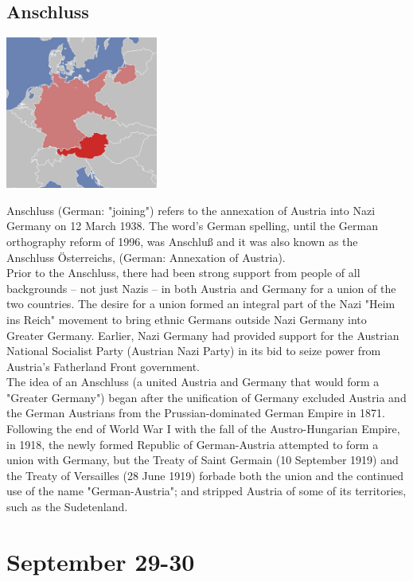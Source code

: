 \documentclass[11pt]{report}
\begin{document}
\subsection{Anschluss}
\vspace{2mm}\begin{center}\includegraphics[width=5cm]{./img/anschluss.jpg}\end{center}
Anschluss (German: "joining") refers to the annexation of Austria into Nazi Germany on 12 March 1938. The word's German spelling, until the German orthography reform of 1996, was Anschluß and it was also known as the Anschluss Österreichs, (German: Annexation of Austria).\\
\indent Prior to the Anschluss, there had been strong support from people of all backgrounds – not just Nazis – in both Austria and Germany for a union of the two countries. The desire for a union formed an integral part of the Nazi "Heim ins Reich" movement to bring ethnic Germans outside Nazi Germany into Greater Germany. Earlier, Nazi Germany had provided support for the Austrian National Socialist Party (Austrian Nazi Party) in its bid to seize power from Austria's Fatherland Front government.\\ \indent The idea of an Anschluss (a united Austria and Germany that would form a "Greater Germany") began after the unification of Germany excluded Austria and the German Austrians from the Prussian-dominated German Empire in 1871. Following the end of World War I with the fall of the Austro-Hungarian Empire, in 1918, the newly formed Republic of German-Austria attempted to form a union with Germany, but the Treaty of Saint Germain (10 September 1919) and the Treaty of Versailles (28 June 1919) forbade both the union and the continued use of the name "German-Austria"; and stripped Austria of some of its territories, such as the Sudetenland.
\section{September 29-30}
\end{document}
